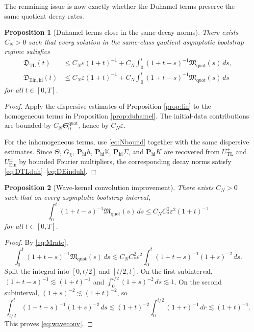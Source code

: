 \documentclass[11pt]{article}
\newtheorem{proposition}{Proposition}
\begin{document}
The remaining issue is now exactly whether the Duhamel terms preserve the same quotient decay rates.

\begin{proposition}[Duhamel terms close in the same decay norms]
\label{prop:close}
There exists \(C_N>0\) such that every solution in the same-class quotient asymptotic bootstrap regime satisfies
\begin{align}
\mathfrak D_{\mathrm{TL}}(t)
&\le
C_N\varepsilon(1+t)^{-1}
+C_N\int_0^t (1+t-s)^{-1}\mathfrak M_{\mathrm{quot}}(s)\,ds,
\label{eq:DTLduh}
\\
\mathfrak D_{\mathrm{Ein,hi}}(t)
&\le
C_N\varepsilon(1+t)^{-1}
+C_N\int_0^t (1+t-s)^{-1}\mathfrak M_{\mathrm{quot}}(s)\,ds
\label{eq:DEinduh}
\end{align}
for all \(t\in[0,T]\).
\end{proposition}

\begin{proof}
Apply the dispersive estimates of Proposition \ref{prop:lin} to the homogeneous terms in Proposition \ref{prop:duhamel}. The initial-data contributions are bounded by \(C_N\mathfrak S_0^{\mathrm{quot}}\), hence by \(C_N\varepsilon\).

For the inhomogeneous terms, use \eqref{eq:Nbound} together with the same dispersive estimates. Since \(\Theta\), \(G_\chi\), \(\mathbf P_{\mathrm{hi}}h\), \(\mathbf P_{\mathrm{hi}}\mathbb K\), \(\mathbf P_{\mathrm{hi}}\Sigma\), and \(\mathbf P_{\mathrm{hi}}K\) are recovered from \(U_{\mathrm{TL}}^\pm\) and \(U_{\mathrm{Ein}}^\pm\) by bounded Fourier multipliers, the corresponding decay norms satisfy \eqref{eq:DTLduh}--\eqref{eq:DEinduh}.
\end{proof}

\begin{proposition}[Wave-kernel convolution improvement]
\label{prop:conv}
There exists \(C_N>0\) such that on every asymptotic bootstrap interval,
\begin{equation}
\int_0^t (1+t-s)^{-1}\mathfrak M_{\mathrm{quot}}(s)\,ds
\le
C_NC_\ast^2\varepsilon^2(1+t)^{-1}
\label{eq:waveconv}
\end{equation}
for all \(t\in[0,T]\).
\end{proposition}

\begin{proof}
By \eqref{eq:Mrate},
\[
\int_0^t (1+t-s)^{-1}\mathfrak M_{\mathrm{quot}}(s)\,ds
\lesssim
C_NC_\ast^2\varepsilon^2
\int_0^t (1+t-s)^{-1}(1+s)^{-2}\,ds.
\]
Split the integral into \([0,t/2]\) and \([t/2,t]\). On the first subinterval, \((1+t-s)^{-1}\lesssim (1+t)^{-1}\) and \(\int_0^{t/2}(1+s)^{-2}\,ds\lesssim 1\). On the second subinterval, \((1+s)^{-2}\lesssim (1+t)^{-2}\), so
\[
\int_{t/2}^t (1+t-s)^{-1}(1+s)^{-2}\,ds
\lesssim
(1+t)^{-2}\int_0^{t/2}(1+r)^{-1}\,dr
\lesssim
(1+t)^{-1}.
\]
This proves \eqref{eq:waveconv}.
\end{proof}
\end{document}
